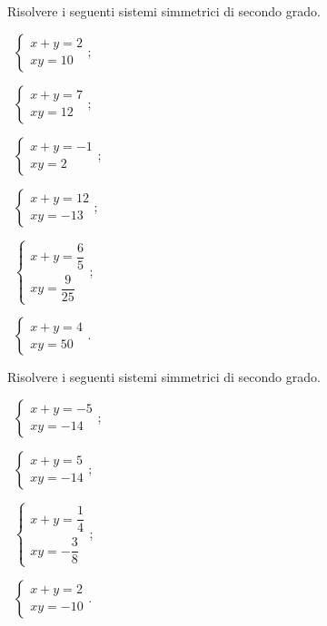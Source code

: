 \begin{esercizio}[\Ast]
 \label{ese:6.24}
Risolvere i seguenti sistemi simmetrici di secondo grado.
\begin{multicols}{3}
 \begin{enumeratea}
 \item~$\left\{\begin{array}{l}x+y=2\\{xy}=10 \end{array}\right.$;
 \item~$\left\{\begin{array}{l}x+y=7\\{xy}=12 \end{array}\right.$;
 \item~$\left\{\begin{array}{l}x+y=-1\\{xy}=2 \end{array}\right.$;
 \item~$\left\{\begin{array}{l}x+y=12\\{xy}=-13 \end{array}\right.$;
 \item~$\left\{\begin{array}{l}x+y=\dfrac 6 5\\{xy}=\dfrac 9{25}\end{array}\right.$;
 \item~$\left\{\begin{array}{l}x+y=4\\{xy}=50 \end{array}\right.$.
 \end{enumeratea}
 \end{multicols}
\end{esercizio}

\begin{esercizio}[\Ast]
 \label{ese:6.25}
Risolvere i seguenti sistemi simmetrici di secondo grado.
\begin{multicols}{2}
 \begin{enumeratea}
 \item~$\left\{\begin{array}{l}x+y=-5\\{xy}=-14 \end{array}\right.$;
 \item~$\left\{\begin{array}{l}x+y=5\\{xy}=-14\end{array}\right.$;
 \item~$\left\{\begin{array}{l}x+y=\dfrac 1 4\\{xy}=-\dfrac 3 8\end{array}\right.$;
 \item~$\left\{\begin{array}{l}x+y=2\\{xy}=-10\end{array}\right.$.
 \end{enumeratea}
 \end{multicols}
\end{esercizio}

